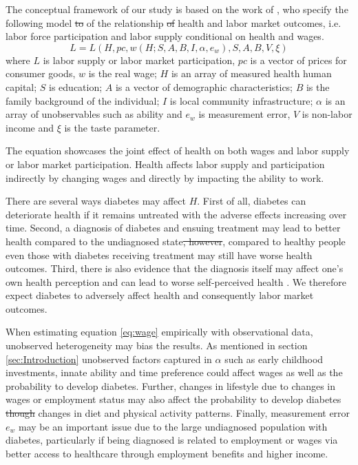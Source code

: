 \documentclass[12pt,english,british]{article}
\providecommand{\DIFaddtex}[1]{{\protect\color{blue}\uwave{#1}}} %
\providecommand{\DIFdeltex}[1]{{\protect\color{red}\sout{#1}}}                      %
\providecommand{\DIFaddbegin}{} %
\providecommand{\DIFaddend}{} %
\providecommand{\DIFdelbegin}{} %
\providecommand{\DIFdelend}{} %
\providecommand{\DIFadd}[1]{\texorpdfstring{\DIFaddtex{#1}}{#1}} %
\providecommand{\DIFdel}[1]{\texorpdfstring{\DIFdeltex{#1}}{}} %
\begin{document}
  
The conceptual framework of our study is based on the work of \citet{Strauss1998},   who specify the following model \DIFdelbegin \DIFdel{to }\DIFdelend of the relationship \DIFdelbegin \DIFdel{of }\DIFdelend \DIFaddbegin \DIFadd{between }\DIFaddend health and labor market outcomes, i.e. labor force participation and labor supply conditional on health and wages.
\begin{equation}
L=L(H, pc, w(H;S,A,B,I,\alpha,e_{w}), S, A, B, V, \xi) \label{eq:wage}
\end{equation}
where $L$ is labor supply or labor market participation, $pc$ is a vector of prices for consumer goods, $w$ is the real wage; $H$ is an array of measured health human capital; $S$ is education; $A$ is a vector of demographic characteristics; $B$ is the family background of the individual; $I$ is local community infrastructure; $\alpha$ is an array of unobservables such as ability and $e_w$ is measurement error, $V$ is non-labor income and $\xi$ is the taste parameter. 

The equation showcases the joint effect of health on both wages and labor supply or labor market participation. Health affects labor supply and participation indirectly by changing wages and directly by impacting the ability to work.

There are several ways diabetes may affect $H$. First of all, diabetes can deteriorate health if it remains untreated with the adverse effects increasing over time. Second, a diagnosis of diabetes and ensuing treatment may lead to better health compared to the undiagnosed state\DIFdelbegin \DIFdel{, however}\DIFdelend \DIFaddbegin \DIFadd{. However}\DIFaddend , compared to healthy people even those with diabetes receiving treatment may still have worse health outcomes. Third, there is also evidence that the diagnosis itself may affect one's own health perception and can lead to worse self-perceived health \citep{Thoolen2006a}. We therefore expect diabetes to adversely affect health and consequently labor market outcomes.

When estimating equation  \ref{eq:wage} empirically with observational data, unobserved heterogeneity may bias the results. As mentioned in section  \ref{sec:Introduction} unobserved factors captured in $\alpha$ such as early childhood investments, innate ability and time preference could affect wages as well as the probability to develop diabetes. Further, changes in lifestyle due to changes in wages or employment status may also affect the probability to develop diabetes \DIFdelbegin \DIFdel{though }\DIFdelend \DIFaddbegin \DIFadd{through }\DIFaddend changes in diet and physical activity patterns. Finally, measurement error $e_w$ may be an important issue due to the large undiagnosed population with diabetes, particularly if being diagnosed is related to employment or wages via better access to healthcare through employment benefits and higher income.
\end{document}
